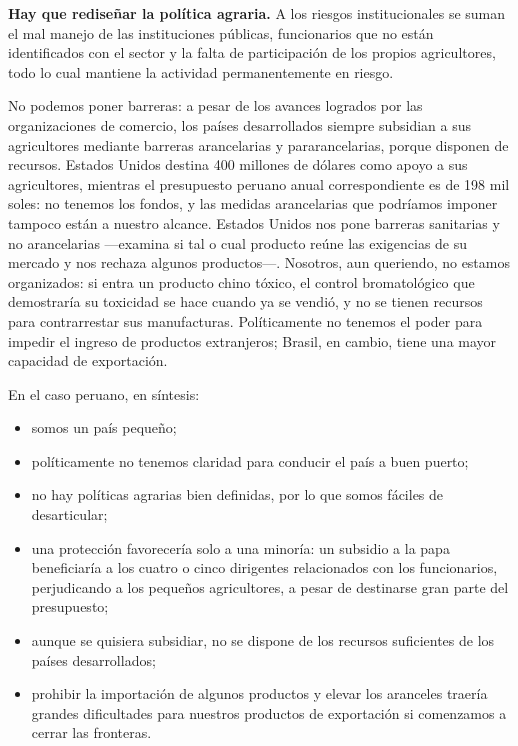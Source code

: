 \documentclass[
  man,
  floatsintext,
  longtable,
  a4paper,
  nolmodern,
  notxfonts,
  notimes,
  12pt,
  colorlinks=true,linkcolor=blue,citecolor=blue,urlcolor=blue]{apa7}
\providecommand{\tightlist}{%
  \setlength{\itemsep}{0pt}\setlength{\parskip}{0pt}}
\begin{document}
\textbf{Hay que rediseñar la política agraria.} A los riesgos
institucionales se suman el mal manejo de las instituciones públicas,
funcionarios que no están identificados con el sector y la falta de
participación de los propios agricultores, todo lo cual mantiene la
actividad permanentemente en riesgo.

No podemos poner barreras: a pesar de los avances logrados por las
organizaciones de comercio, los países desarrollados siempre subsidian a
sus agricultores mediante barreras arancelarias y pararancelarias,
porque disponen de recursos. Estados Unidos destina 400 millones de
dólares como apoyo a sus agricultores, mientras el presupuesto peruano
anual correspondiente es de 198 mil soles: no tenemos los fondos, y las
medidas arancelarias que podríamos imponer tampoco están a nuestro
alcance. Estados Unidos nos pone barreras sanitarias y no arancelarias
---examina si tal o cual producto reúne las exigencias de su mercado y
nos rechaza algunos productos---. Nosotros, aun queriendo, no estamos
organizados: si entra un producto chino tóxico, el control bromatológico
que demostraría su toxicidad se hace cuando ya se vendió, y no se tienen
recursos para contrarrestar sus manufacturas. Políticamente no tenemos
el poder para impedir el ingreso de productos extranjeros; Brasil, en
cambio, tiene una mayor capacidad de exportación.

En el caso peruano, en síntesis:

\begin{itemize}
\tightlist
\item
  somos un país pequeño;
\item
  políticamente no tenemos claridad para conducir el país a buen puerto;
\item
  no hay políticas agrarias bien definidas, por lo que somos fáciles de
  desarticular;
\item
  una protección favorecería solo a una minoría: un subsidio a la papa
  beneficiaría a los cuatro o cinco dirigentes relacionados con los
  funcionarios, perjudicando a los pequeños agricultores, a pesar de
  destinarse gran parte del presupuesto;
\item
  aunque se quisiera subsidiar, no se dispone de los recursos
  suficientes de los países desarrollados;
\item
  prohibir la importación de algunos productos y elevar los aranceles
  traería grandes dificultades para nuestros productos de exportación si
  comenzamos a cerrar las fronteras.
\end{itemize}
\end{document}
